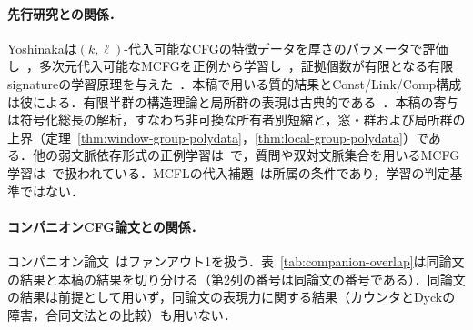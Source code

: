 \documentclass[11pt,a4paper]{ltjsarticle}
\numberwithin{equation}{section}
\theoremstyle{plain}
\theoremstyle{definition}
\theoremstyle{remark}
\begin{document}
\paragraph{先行研究との関係．}
Yoshinakaは$(k,\ell)$-代入可能なCFGの特徴データを厚さのパラメータで評価し~\cite{Yoshinaka2008}，多次元代入可能なMCFGを正例から学習し~\cite{Yoshinaka2009,Yoshinaka2011}，証拠個数が有限となる有限signatureの学習原理を与えた~\cite{Yoshinaka2015General}．本稿で用いる質的結果とConst/Link/Comp構成は彼による．有限半群の構造理論と局所群の表現は古典的である~\cite{Straubing1985,Tilson1987,AlmeidaEtAl2009}．本稿の寄与は符号化総長の解析，すなわち非可換な所有者別短縮と，窓・群および局所群の上界（定理~\ref{thm:window-group-polydata}，\ref{thm:local-group-polydata}）である．他の弱文脈依存形式の正例学習は~\cite{OatesEtAl2006}で，質問や双対文脈集合を用いるMCFG学習は~\cite{Yoshinaka2010,ClarkYoshinaka2014,KanazawaYoshinaka2023}で扱われている．MCFLの代入補題~\cite{DuncanEtAl2026Substitution}は所属の条件であり，学習の判定基準ではない．

\paragraph{コンパニオンCFG論文との関係．}
コンパニオン論文~\cite{kuriyamaCFG}はファンアウト1を扱う．表~\ref{tab:companion-overlap}は同論文の結果と本稿の結果を切り分ける（第2列の番号は同論文の番号である）．同論文の結果は前提として用いず，同論文の表現力に関する結果（カウンタとDyckの障害，合同文法との比較）も用いない．
\end{document}
